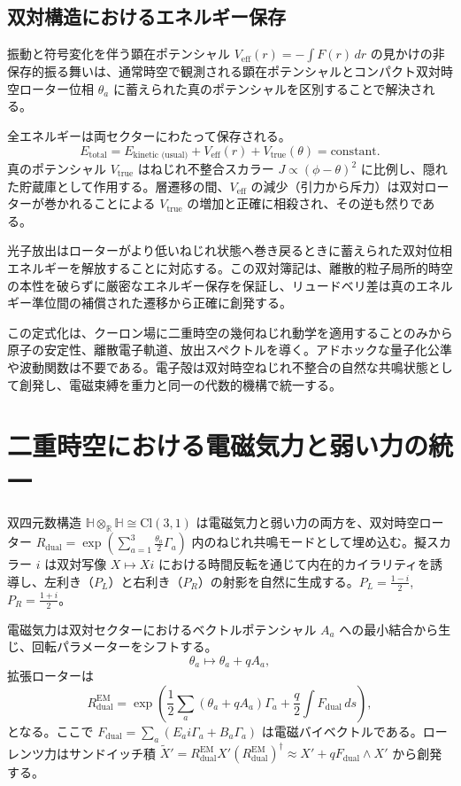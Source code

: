 \documentclass[a4paper]{article}
\begin{document}
\subsection{双対構造におけるエネルギー保存}

振動と符号変化を伴う顕在ポテンシャル $V_\text{eff}(r) = -\int F(r)\, dr$ の見かけの非保存的振る舞いは、通常時空で観測される顕在ポテンシャルとコンパクト双対時空ローター位相 $\theta_a$ に蓄えられた真のポテンシャルを区別することで解決される。

全エネルギーは両セクターにわたって保存される。
\[
E_\text{total} = E_\text{kinetic (usual)} + V_\text{eff}(r) + V_\text{true}(\theta) = \text{constant}.
\]
真のポテンシャル $V_\text{true}$ はねじれ不整合スカラー $J \propto (\phi - \theta)^2$ に比例し、隠れた貯蔵庫として作用する。層遷移の間、$V_\text{eff}$ の減少（引力から斥力）は双対ローターが巻かれることによる $V_\text{true}$ の増加と正確に相殺され、その逆も然りである。

光子放出はローターがより低いねじれ状態へ巻き戻るときに蓄えられた双対位相エネルギーを解放することに対応する。この双対簿記は、離散的粒子局所的時空の本性を破らずに厳密なエネルギー保存を保証し、リュードベリ差は真のエネルギー準位間の補償された遷移から正確に創発する。

この定式化は、クーロン場に二重時空の幾何ねじれ動学を適用することのみから原子の安定性、離散電子軌道、放出スペクトルを導く。アドホックな量子化公準や波動関数は不要である。電子殻は双対時空ねじれ不整合の自然な共鳴状態として創発し、電磁束縛を重力と同一の代数的機構で統一する。

\section{二重時空における電磁気力と弱い力の統一}
\label{sec:unification}

双四元数構造 $\mathbb{H} \otimes_{\mathbb{R}} \mathbb{H} \cong \mathrm{Cl}(3,1)$ は電磁気力と弱い力の両方を、双対時空ローター $R_{\text{dual}} = \exp\left( \sum_{a=1}^3 \frac{\theta_a}{2} \Gamma_a \right)$ 内のねじれ共鳴モードとして埋め込む。擬スカラー $i$ は双対写像 $X \mapsto X i$ における時間反転を通じて内在的カイラリティを誘導し、左利き（$P_L$）と右利き（$P_R$）の射影を自然に生成する。$P_L = \frac{1 - i}{2}$, $P_R = \frac{1 + i}{2}$。

電磁気力は双対セクターにおけるベクトルポテンシャル $A_a$ への最小結合から生じ、回転パラメーターをシフトする。
\[
\theta_a \mapsto \theta_a + q A_a,
\]
拡張ローターは
\[
R_{\text{dual}}^{\text{EM}} = \exp\left( \frac{1}{2} \sum_a (\theta_a + q A_a) \Gamma_a + \frac{q}{2} \int F_{\text{dual}} \, ds \right),
\]
となる。ここで $F_{\text{dual}} = \sum_a (E_a i \Gamma_a + B_a \Gamma_a)$ は電磁バイベクトルである。ローレンツ力はサンドイッチ積 $\tilde{X}' = R_{\text{dual}}^{\text{EM}} X' (R_{\text{dual}}^{\text{EM}})^\dagger \approx X' + q F_{\text{dual}} \wedge X'$ から創発する。
\end{document}
